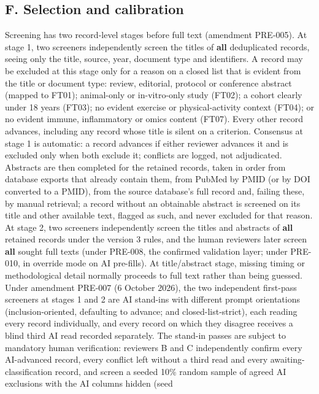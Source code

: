\documentclass[
  11pt,
  a4paper,
]{article}
\begin{document}
\subsection{F. Selection and
calibration}\label{f.-selection-and-calibration}

Screening has two record-level stages before full text (amendment
PRE-005). At stage 1, two screeners independently screen the titles of
\textbf{all} deduplicated records, seeing only the title, source, year,
document type and identifiers. A record may be excluded at this stage
only for a reason on a closed list that is evident from the title or
document type: review, editorial, protocol or conference abstract
(mapped to FT01); animal-only or in-vitro-only study (FT02); a cohort
clearly under 18 years (FT03); no evident exercise or physical-activity
context (FT04); or no evident immune, inflammatory or omics content
(FT07). Every other record advances, including any record whose title is
silent on a criterion. Consensus at stage 1 is automatic: a record
advances if either reviewer advances it and is excluded only when both
exclude it; conflicts are logged, not adjudicated. Abstracts are then
completed for the retained records, taken in order from database exports
that already contain them, from PubMed by PMID (or by DOI converted to a
PMID), from the source database's full record and, failing these, by
manual retrieval; a record without an obtainable abstract is screened on
its title and other available text, flagged as such, and never excluded
for that reason. At stage 2, two screeners independently screen the
titles and abstracts of \textbf{all} retained records under the version
3 rules, and the human reviewers later screen \textbf{all} sought full
texts (under PRE-008, the confirmed validation layer; under PRE-010, in
override mode on AI pre-fills). At title/abstract stage, missing timing
or methodological detail normally proceeds to full text rather than
being guessed. Under amendment PRE-007 (6 October 2026), the two
independent first-pass screeners at stages 1 and 2 are AI stand-ins with
different prompt orientations (inclusion-oriented, defaulting to
advance; and closed-list-strict), each reading every record
individually, and every record on which they disagree receives a blind
third AI read recorded separately. The stand-in passes are subject to
mandatory human verification: reviewers B and C independently confirm
every AI-advanced record, every conflict left without a third read and
every awaiting-classification record, and screen a seeded 10\% random
sample of agreed AI exclusions with the AI columns hidden (seed
\end{document}
